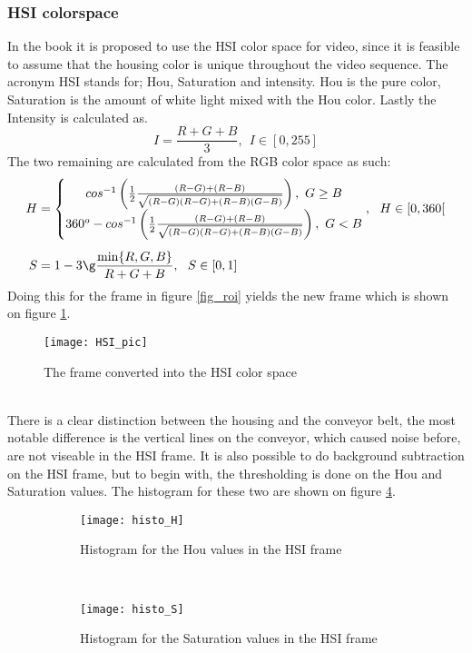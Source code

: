 \subsubsection{HSI colorspace}
In the book \citep{image} it is proposed to use the HSI color space for video, since it is feasible to assume that the housing color is unique throughout the video sequence. The acronym HSI stands for; Hou, Saturation and  intensity.  Hou is the pure color, Saturation is the amount of white light mixed with the Hou color. Lastly the Intensity is calculated as. \citep{image}
\begin{equation}
I=\frac{R+G+B}{3},~~I\in[0,255]
\end{equation} 
The two remaining are calculated from the RGB color space as such: \citep{image}
\begin{align}
	H &= \left\{\begin{matrix}
		cos^{-1}\left(\frac{1}{2} \frac{(R-G)+(R-B)}{\sqrt{(R-G)(R-G)+(R-B)(G-B)}}\right),~G\geq B\\
		360^o-cos^{-1}\left( \frac{1}{2}\frac{(R-G)+(R-B)}{\sqrt{(R-G)(R-G)+(R-B)(G-B)}}\right),~G<B
	\end{matrix}   \right.,~~H\in[0,360[\\[0.5em]
	S &=1-3\g\frac{\min\{R,G,B\}}{R+G+B},~~S\in[0,1]
	\end{align}
Doing this for the frame in figure \ref{fig_roi} yields the new frame which is shown on figure \ref{fig_hsi}.
\begin{figure}[htbp!]
	\centering
	\texttt{[image: HSI\_pic]}
	\caption{The frame converted into the HSI color space}
	\label{fig_hsi}
\end{figure}\\
There is a clear distinction between the housing and the conveyor belt, the most notable difference is the vertical lines on the conveyor, which caused noise before, are not viseable in the HSI frame. It is also possible to do background subtraction on the HSI frame, but to begin with, the thresholding is done on the Hou and Saturation values. The histogram for these two are shown on figure \ref{fig_hsi_histo}.
\begin{figure}[htbp!]
	\centering
	\begin{subfigure}[t]{0.45\textwidth}
		\texttt{[image: histo\_H]}
		\caption{Histogram for the Hou values in the HSI frame}
		\label{fig_histo_h}
		\end{subfigure}~~
	\begin{subfigure}[t]{0.45\textwidth}
		\texttt{[image: histo\_S]}
\caption{Histogram for the Saturation values in the HSI frame}
\label{fig_histo_s}	
	\end{subfigure}
\caption{}
\label{fig_hsi_histo}
\end{figure} \\
